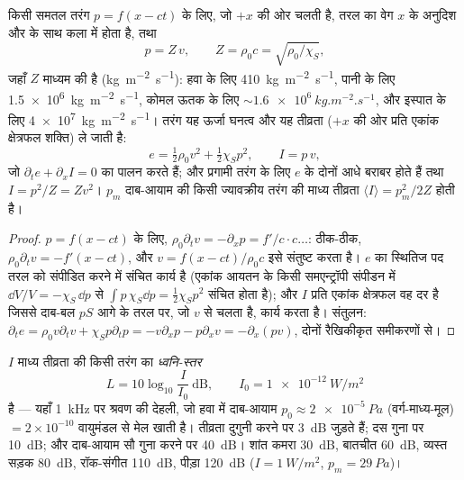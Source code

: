 \begin{proposition}[समतल प्रगामी ध्वनि-तरंग]\label{prop:b2:sound-waves:plane}
किसी समतल तरंग $p = f(x - ct)$ के लिए, जो $+x$ की ओर चलती है, तरल का
वेग $x$ के अनुदिश और  के साथ कला में होता है, तथा
\[
p = Z\,v , \qquad Z = \rho_0c = \sqrt{\rho_0/\chi_S} ,
\]
जहाँ $Z$ माध्यम की \emph{} है
(\unit{kg.m^{-2}.s^{-1}}): हवा के लिए \qty{410}{kg.m^{-2}.s^{-1}}, पानी के लिए \qty{1.5e6}{kg.m^{-2}.s^{-1}},
कोमल ऊतक के लिए $\sim\qty{1.6e6}{kg.m^{-2}.s^{-1}}$,
और इस्पात के लिए \qty{4e7}{kg.m^{-2}.s^{-1}}। तरंग यह ऊर्जा घनत्व और
यह तीव्रता ($+x$ की ओर प्रति एकांक क्षेत्रफल शक्ति) ले जाती है:
\[
e = \tfrac12\rho_0v^2 + \tfrac12\chi_Sp^2 , \qquad I = p\,v ,
\]
जो $\partial_te + \partial_xI = 0$ का पालन करते हैं; और प्रगामी तरंग के लिए $e$ के
दोनों आधे बराबर होते हैं तथा $I = p^2/Z = Zv^2$। $p_m$ दाब-आयाम की किसी
ज्यावक्रीय तरंग की माध्य तीव्रता $\langle I\rangle = p_m^2/2Z$ होती है।
\end{proposition}

\begin{proof}
$p = f(x - ct)$ के लिए, $\rho_0\partial_tv = -\partial_xp = f'/c\cdot c\dots$: ठीक-ठीक,
$\rho_0\partial_tv = -f'(x - ct)$, और $v = f(x - ct)/\rho_0c$ इसे संतुष्ट करता है।
$e$ का स्थितिज पद तरल को संपीडित करने में संचित कार्य है
(एकांक आयतन के किसी समएन्ट्रॉपी संपीडन में $\dd V/V = -\chi_S\,\dd p$
से $\int p\,\chi_S\dd p = \tfrac12\chi_Sp^2$ संचित होता है); और $I$ प्रति एकांक क्षेत्रफल वह दर है जिससे
दाब-बल $pS$ आगे के तरल पर, जो $v$ से चलता है, कार्य करता है।
संतुलन: $\partial_te = \rho_0v\partial_tv + \chi_Sp\partial_tp = -v\partial_xp - p\partial_xv =
-\partial_x(pv)$, दोनों रैखिकीकृत समीकरणों से।
\end{proof}

\begin{definition}[ध्वनि-स्तर]\label{def:b2:sound-waves:decibel}
$I$ माध्य तीव्रता की किसी तरंग का \emph{ध्वनि-स्तर}
\[
L = 10\log_{10}\frac I{I_0} \ \text{dB} , \qquad I_0 = \qty{1e-12}{W/m^2}
\]
है --- यहाँ \qty{1}{kHz} पर श्रवण की देहली, जो हवा में
दाब-आयाम $p_0 \approx \qty{2e-5}{Pa}$ (वर्ग-माध्य-मूल) $= 2 \times 10^{-10}$
वायुमंडल से मेल खाती है। तीव्रता दुगुनी करने पर \qty{3}{dB} जुड़ते हैं; दस गुना पर \qty{10}{dB};
और दाब-आयाम सौ गुना करने पर \qty{40}{dB}। शांत कमरा
\qty{30}{dB}, बातचीत \qty{60}{dB}, व्यस्त सड़क \qty{80}{dB}, रॉक-संगीत
\qty{110}{dB}, पीड़ा \qty{120}{dB} ($I = \qty{1}{W/m^2}$, $p_m = \qty{29}{Pa}$)।
\end{definition}


